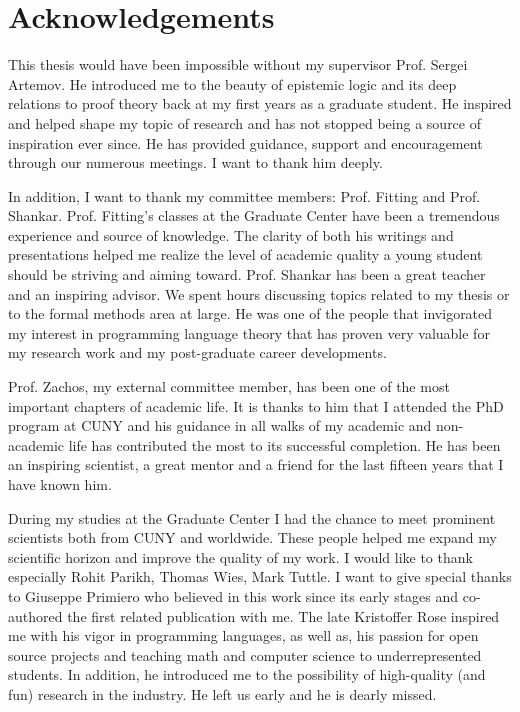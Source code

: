 \section*{Acknowledgements}
This thesis would have been impossible without my supervisor Prof. Sergei Artemov.
He introduced me to the beauty of epistemic logic and its deep relations to proof theory
back at my first years as a graduate student. He inspired and helped shape my topic of research and 
has not stopped being a source of inspiration ever
since. He has provided guidance, support and encouragement through our numerous meetings. 
I want to thank him deeply.

In addition, I want to thank my committee members: Prof. Fitting and Prof. Shankar. Prof. Fitting's classes
 at the Graduate Center have been a tremendous experience and source of knowledge.
The clarity of  both his writings and presentations helped me realize the 
level of academic quality a young student should be striving and aiming toward. Prof. Shankar has
been a great teacher and an inspiring advisor. We spent hours 
discussing topics related to my thesis or to the formal methods area at large. He was one
of the people that invigorated my interest in programming language theory that has
proven very valuable for my research work and my post-graduate career developments.

Prof. Zachos, my external committee member, has been one of the most important
chapters of academic life. It is thanks to him that I attended the PhD program at CUNY
and his guidance in all walks of my academic and non-academic life has contributed 
the most  to its successful completion. He has been an inspiring
scientist, a great mentor and a friend for the last fifteen years that I have 
known him. 


During my studies at the Graduate Center I had the chance to meet 
prominent scientists both from CUNY and worldwide. 
These people helped me expand my scientific horizon and improve
the quality of my work. I would like to thank especially Rohit Parikh, Thomas Wies,  
 Mark Tuttle. I want to give special thanks to Giuseppe Primiero who believed in this work
 since its early stages and co-authored the first related publication with me. 
 The late Kristoffer Rose inspired me with his vigor in programming languages, as well as, his passion
 for open source projects and teaching math and computer science to underrepresented students. 
 In addition, he introduced me to the possibility of high-quality (and fun) research in the industry. 
 He left us early and he is dearly missed.

